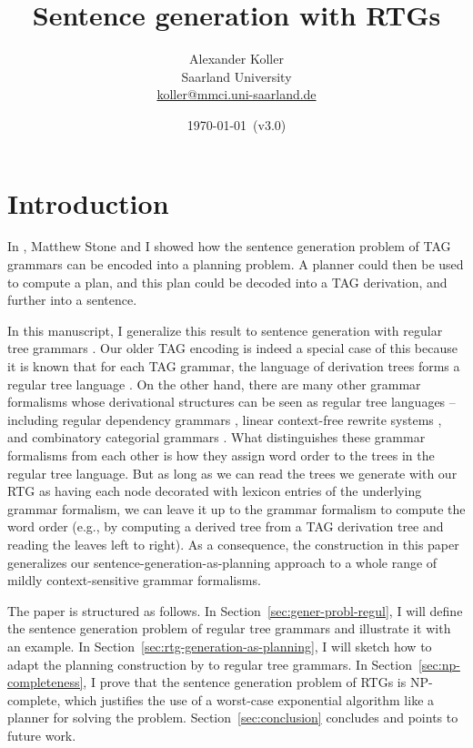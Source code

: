 \documentclass[11pt,a4]{article}
\title{Sentence generation with RTGs}
\author{Alexander Koller \\ Saarland University \\
  \url{koller@mmci.uni-saarland.de}}
\date{\today\ (v3.0)}
\theoremstyle{plain}
\theoremstyle{definition}
\begin{document}
\maketitle

\section{Introduction} \label{sec:introduction}

In \citet{KolSto07}, Matthew Stone and I showed how the sentence
generation problem of TAG grammars can be encoded into a planning
problem. A planner could then be used to compute a plan, and this plan
could be decoded into a TAG derivation, and further into a sentence.

In this manuscript, I generalize this result to sentence generation
with regular tree grammars \citep{tata2007}.  Our older TAG encoding
is indeed a special case of this because it is known that for each TAG
grammar, the language of derivation trees forms a regular tree
language \citep{schmitz08:_featur_in_tag_deriv_trees}. On the other
hand, there are many other grammar formalisms whose derivational
structures can be seen as regular tree languages -- including regular
dependency grammars \citep{kuhlmann2007mildly}, linear context-free
rewrite systems
\citep{weir88:_charac_mildl_contex_sensit_gramm_formal}, and
combinatory categorial grammars
\citep{steedman01:_syntac_proces,KolKuh09}. What distinguishes these
grammar formalisms from each other is how they assign word order to
the trees in the regular tree language. But as long as we can read the
trees we generate with our RTG as having each node decorated with
lexicon entries of the underlying grammar formalism, we can leave it
up to the grammar formalism to compute the word order (e.g., by
computing a derived tree from a TAG derivation tree and reading the
leaves left to right). As a consequence, the construction in this
paper generalizes our sentence-generation-as-planning approach to a
whole range of mildly context-sensitive grammar formalisms.

The paper is structured as follows. In
Section~\ref{sec:gener-probl-regul}, I will define the sentence
generation problem of regular tree grammars and illustrate it with an
example. In Section~\ref{sec:rtg-generation-as-planning}, I will
sketch how to adapt the planning construction by \citet{KolSto07} to
regular tree grammars. In Section~\ref{sec:np-completeness}, I prove
that the sentence generation problem of RTGs is NP-complete, which
justifies the use of a worst-case exponential algorithm like a planner
for solving the problem. Section~\ref{sec:conclusion} concludes and
points to future work.
\end{document}

